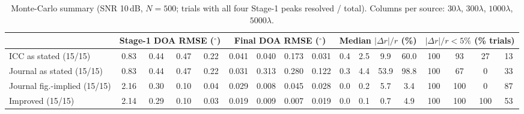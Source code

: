 \begin{table}[!htbp]\centering\scriptsize
\caption{Monte-Carlo summary (SNR 10\,dB, $N=500$; trials with all four Stage-1 peaks resolved / total). Columns
per source: $30\lambda$, $300\lambda$, $1000\lambda$, $5000\lambda$.}\label{tab:mc}
\setlength{\tabcolsep}{2.6pt}
\begin{tabular}{@{}l|cccc|cccc|cccc|cccc@{}}\toprule
 & \multicolumn{4}{c|}{Stage-1 DOA RMSE ($^\circ$)} & \multicolumn{4}{c|}{Final DOA RMSE ($^\circ$)} &
 \multicolumn{4}{c|}{Median $|\Delta r|/r$ (\%)} & \multicolumn{4}{c}{$|\Delta r|/r<5\%$ (\% trials)}\\\midrule
ICC as stated (15/15) & 0.83 & 0.44 & 0.47 & 0.22 & 0.041 & 0.040 & 0.173 & 0.031 & 0.4 & 2.5 & 9.9 & 60.0 & 100 & 93 & 27 & 13 \\
Journal as stated (15/15) & 0.83 & 0.44 & 0.47 & 0.22 & 0.031 & 0.313 & 0.280 & 0.122 & 0.3 & 4.4 & 53.9 & 98.8 & 100 & 67 & 0 & 33 \\
Journal fig.-implied (15/15) & 2.16 & 0.30 & 0.10 & 0.04 & 0.029 & 0.008 & 0.045 & 0.028 & 0.0 & 0.2 & 5.7 & 3.4 & 100 & 100 & 0 & 87 \\
Improved (15/15) & 2.14 & 0.29 & 0.10 & 0.03 & 0.019 & 0.009 & 0.007 & 0.019 & 0.0 & 0.1 & 0.7 & 4.9 & 100 & 100 & 100 & 53 \\
\bottomrule\end{tabular}\end{table}